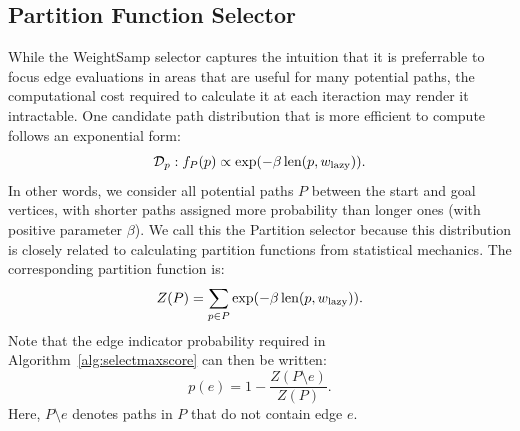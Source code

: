\documentclass[nobib]{tufte-book}
\newcommand{\ms}[1]{\mbox{\scriptsize #1}}
\begin{document}
\subsection{Partition Function Selector}

While the WeightSamp selector captures the intuition that it is
preferrable to focus edge evaluations in areas that are useful for
many potential paths,
the computational cost required to calculate it at each iteraction
may render it intractable.
One candidate path distribution that is more efficient to compute
follows an exponential form:
\begin{equation}
   \mathcal{D}_p : f_P(p) \propto
   \exp( - \beta \, \mbox{len}(p, w_{\ms{lazy}}) ).
\end{equation}
In other words,
we consider all potential paths $P$
between the start and goal vertices,
with shorter paths assigned more probability than longer ones
(with positive parameter $\beta$).
We call this the Partition selector
because this distribution is closely related to calculating
partition functions from statistical mechanics.
The corresponding partition function is:
\begin{equation}
   Z(P) = \sum_{p \in P}
      \exp( - \beta \, \mbox{len}(p, w_{\ms{lazy}}) ).
   \label{eqn:partitionfn}
\end{equation}
Note that the edge indicator probability
required in Algorithm~\ref{alg:selectmaxscore}
can then be written:
\begin{equation}
   p(e) = 1 - \frac{Z(P \setminus e)}{Z(P)}.
   \label{eqn:edge-ind-prob}
\end{equation}
Here, $P \setminus e$ denotes paths in $P$ that do not
contain edge $e$.
\end{document}
